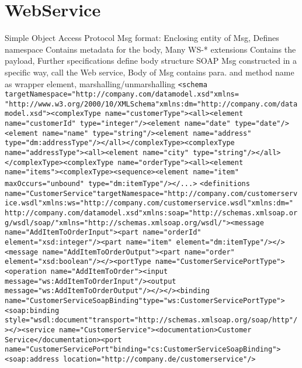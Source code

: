 \section{WebService}
Simple Object Access Protocol
Msg format: 
Enclosing entity of Msg, Defines namespace
Contains metadata for the body, 
Many WS-* extensions
Contains the payload, 
Further specifications define body structure
\btext{\hlgray{--:}}
SOAP Msg constructed in a specific way, 
call the Web service, 
Body of Msg contains para. and method name 
as wrapper element,
marshalling/unmarshalling
\lstinline{<schema targetNamespace="http://company.com/datamodel.xsd"xmlns= "http://www.w3.org/2000/10/XMLSchema"xmlns:dm="http://company.com/datamodel.xsd"><complexType name="customerType"><all><element name="customerId" type="integer"/><element name="date" type="date"/><element name="name" type="string"/><element name="address" type="dm:addressType"/></all></complexType><complexType name="addressType"><all><element name="city" type="string"/></all></complexType><complexType name="orderType"><all><element name="items"><complexType><sequence><element name="item" maxOccurs="unbound" type="dm:itemType"/></...>}
\lstinline{<definitions name="CustomerService"targetNamespace="http://company.com/customerservice.wsdl"xmlns:ws="http://company.com/customerservice.wsdl"xmlns:dm=" http://company.com/datamodel.xsd"xmlns:soap="http://schemas.xmlsoap.org/wsdl/soap/"xmlns="http://schemas.xmlsoap.org/wsdl/"><message name="AddItemToOrderInput"><part name="orderId" element="xsd:integer"/><part name="item" element="dm:itemType"/></><message name="AddItemToOrderOutput"><part name="order" element="xsd:boolean"/></><portType name="CustomerServicePortType"><operation name="AddItemToOrder"><input message="ws:AddItemToOrderInput"/><output message="ws:AddItemToOrderOutput"/></></><binding name="CustomerServiceSoapBinding"type="ws:CustomerServicePortType"><soap:binding style="wsdl:document"transport="http://schemas.xmlsoap.org/soap/http"/></><service name="CustomerService"><documentation>Customer Service</documentation><port name="CustomerServicePort"binding="cs:CustomerServiceSoapBinding"><soap:address location="http://company.de/customerservice"/>}
